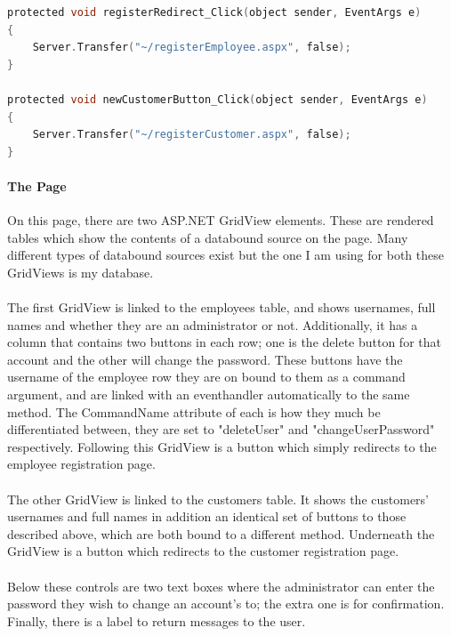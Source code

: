 ﻿\documentclass{article}
\begin{document}
\begin{lstlisting}[language=C]
protected void registerRedirect_Click(object sender, EventArgs e)
{
    Server.Transfer("~/registerEmployee.aspx", false);
}

protected void newCustomerButton_Click(object sender, EventArgs e)
{
    Server.Transfer("~/registerCustomer.aspx", false);
}
    \end{lstlisting}
    \paragraph{The Page}
    On this page, there are two ASP.NET GridView elements.
    These are rendered tables which show the contents of a databound source on the page.
    Many different types of databound sources exist but the one I am using for both these GridViews is my database.
    \paragraph{}
    The first GridView is linked to the employees table, and shows usernames, full names and whether they are an administrator or not.
    Additionally, it has a column that contains two buttons in each row; one is the delete button for that account and the other will change the password.
    These buttons have the username of the employee row they are on bound to them as a command argument, and are linked with an eventhandler automatically to the same method.
    The CommandName attribute of each is how they much be differentiated between, they are set to "deleteUser" and "changeUserPassword" respectively.
    Following this GridView is a button which simply redirects to the employee registration page.
    \paragraph{}
    The other GridView is linked to the customers table.
    It shows the customers' usernames and full names in addition an identical set of buttons to those described above, which are both bound to a different method.
    Underneath the GridView is a button which redirects to the customer registration page.
    \paragraph{}
    Below these controls are two text boxes where the administrator can enter the password they wish to change an account's to; the extra one is for confirmation.
    Finally, there is a label to return messages to the user.
\end{document}
